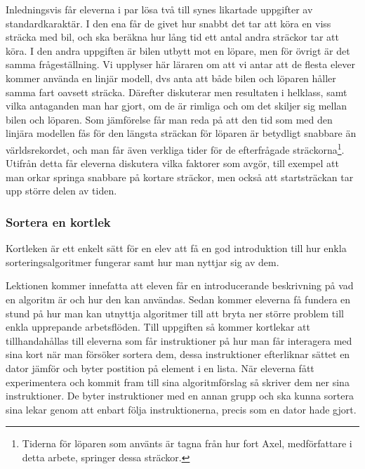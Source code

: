     \textcolor{lila}{Inledningsvis får eleverna i par lösa två till synes likartade uppgifter av standardkaraktär. I den ena får de givet hur snabbt det tar att köra en viss sträcka med bil, och ska beräkna hur lång tid ett antal andra sträckor tar att köra. I den andra uppgiften är bilen utbytt mot en löpare, men för övrigt är det samma frågeställning. Vi upplyser här läraren om att vi antar att de flesta elever kommer använda en linjär modell, dvs anta att både bilen och löparen håller samma fart oavsett sträcka. Därefter diskuterar men resultaten i helklass, samt vilka antaganden man har gjort, om de är rimliga och om det skiljer sig mellan bilen och löparen. Som jämförelse får man reda på att den tid som med den linjära modellen fås för den längsta sträckan för löparen är betydligt snabbare än världsrekordet, och man får även verkliga tider för de efterfrågade sträckorna\footnote{Tiderna för löparen som använts är tagna från hur fort Axel, medförfattare i detta arbete, springer dessa sträckor.}. Utifrån detta får eleverna diskutera vilka faktorer som avgör, till exempel att man orkar springa snabbare på kortare sträckor, men också att startsträckan tar upp större delen av tiden.}
    
\subsubsection{Sortera en kortlek}
    \label{sec:Sortera}
    
    \textcolor{WildStrawberry}{
        Kortleken är ett enkelt sätt för en elev att få en god introduktion till hur enkla sorteringsalgoritmer fungerar samt hur man nyttjar sig av dem. }
        
    \textcolor{WildStrawberry}{
        Lektionen kommer innefatta att eleven får en introducerande beskrivning på vad en algoritm är och hur den kan användas. Sedan kommer eleverna få fundera en stund på hur man kan utnyttja algoritmer till att bryta ner större problem till enkla upprepande arbetsflöden. Till uppgiften så kommer kortlekar att tillhandahållas till eleverna som får instruktioner på hur man får interagera med sina kort när man försöker sortera dem, dessa instruktioner efterliknar sättet en dator jämför och byter postition på element i en lista. När eleverna fått experimentera och kommit fram till sina algoritmförslag så skriver dem ner sina instruktioner. De byter instruktioner med en annan grupp och ska kunna sortera sina lekar genom att enbart följa instruktionerna, precis som en dator hade gjort. }
        
